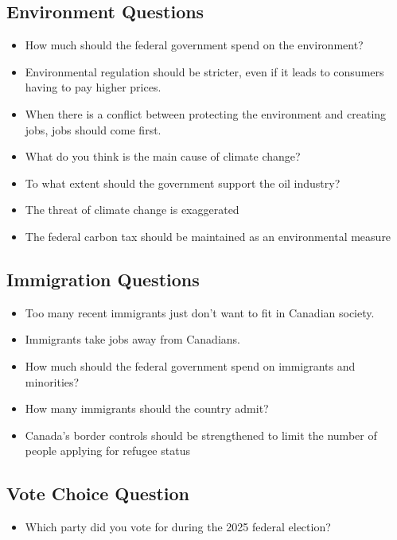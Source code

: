 \subsection{Environment Questions}
\begin{itemize}
  \item How much should the federal government spend on the environment?
  \item Environmental regulation should be stricter, even if it leads to consumers having to pay higher prices.
  \item When there is a conflict between protecting the environment and creating jobs, jobs should come first.
  \item What do you think is the main cause of climate change?
  \item To what extent should the government support the oil industry?
  \item The threat of climate change is exaggerated
  \item The federal carbon tax should be maintained as an environmental measure
\end{itemize}

\subsection{Immigration Questions}
\begin{itemize}
  \item Too many recent immigrants just don't want to fit in Canadian society.
  \item Immigrants take jobs away from Canadians.
  \item How much should the federal government spend on immigrants and minorities?
  \item How many immigrants should the country admit?
  \item Canada's border controls should be strengthened to limit the number of people applying for refugee status
\end{itemize}

\subsection{Vote Choice Question}
\begin{itemize}
  \item Which party did you vote for during the 2025 federal election?
\end{itemize}

\clearpage

